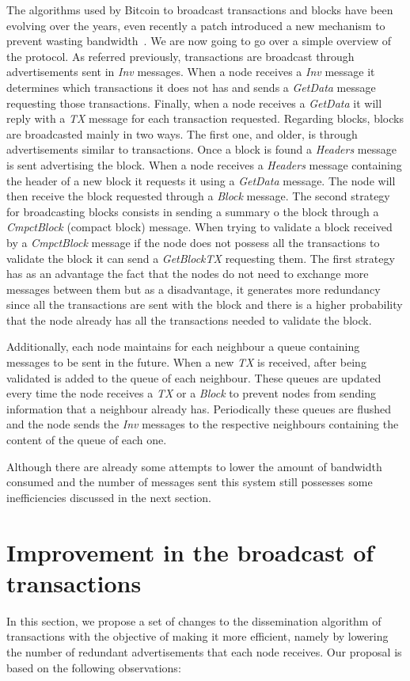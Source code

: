 \documentclass{dads}   %
\begin{document}
The algorithms used by Bitcoin to broadcast transactions and blocks have been evolving over the years, even recently a patch introduced a new mechanism to prevent wasting bandwidth~\cite{bip152}. We are now going to go over a simple overview of the protocol. As referred previously, transactions are broadcast through advertisements sent in \textsl{Inv} messages. When a node receives a \textsl{Inv} message it determines which transactions it does not has and sends a \textsl{GetData} message requesting those transactions. Finally, when a node receives a \textsl{GetData} it will reply with a \textsl{TX} message for each transaction requested. Regarding blocks, blocks are broadcasted mainly in two ways. The first one, and older, is through advertisements similar to transactions. Once a block is found a \textsl{Headers} message is sent advertising the block. When a node receives a \textsl{Headers} message containing the header of a new block it requests it using a \textsl{GetData} message. The node will then receive the block requested through a \textsl{Block} message. The second strategy for broadcasting blocks consists in sending a summary o the block through a \textsl{CmpctBlock} (compact block) message. When trying to validate a block received by a \textsl{CmpctBlock} message if the node does not possess all the transactions to validate the block it can send a \textsl{GetBlockTX} requesting them. The first strategy has as an advantage the fact that the nodes do not need to exchange more messages between them but as a disadvantage, it generates more redundancy since all the transactions are sent with the block and there is a higher probability that the node already has all the transactions needed to validate the block.

Additionally, each node maintains for each neighbour a queue containing messages to be sent in the future. When a new \textsl{TX} is received, after being validated is added to the queue of each neighbour. These queues are updated every time the node receives a \textsl{TX} or a \textsl{Block} to prevent nodes from sending information that a neighbour already has. Periodically these queues are flushed and the node sends the \textsl{Inv} messages to the respective neighbours containing the content of the queue of each one.

Although there are already some attempts to lower the amount of bandwidth consumed and the number of messages sent this system still possesses some inefficiencies discussed in the next section.

\section{Improvement in the broadcast of transactions}
In this section, we propose a set of changes to the dissemination algorithm of transactions with the objective of making it more efficient, namely by lowering the number of redundant advertisements that each node receives. Our proposal is based on the following observations:
\end{document}
